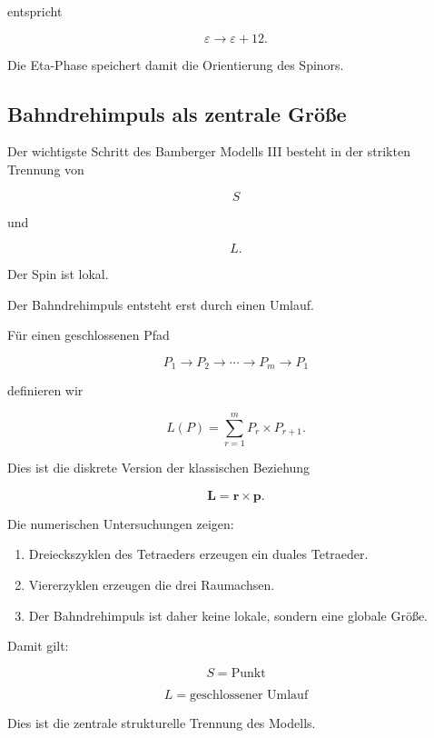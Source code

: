 \documentclass[11pt,a4paper]{article}
\theoremstyle{definition}
\theoremstyle{remark}
\begin{document}
	entspricht
	
	\[
	\varepsilon
	\rightarrow
	\varepsilon+12.
	\]
	
	Die Eta-Phase speichert damit die Orientierung
	des Spinors.
	
	
	\subsection{Bahndrehimpuls als zentrale Größe}
	
	Der wichtigste Schritt des Bamberger Modells III
	besteht in der strikten Trennung von
	
	\[
	S
	\]
	
	und
	
	\[
	L.
	\]
	
	Der Spin ist lokal.
	
	Der Bahndrehimpuls entsteht erst durch einen Umlauf.
	
	\bigskip
	
	Für einen geschlossenen Pfad
	
	\[
	P_1
	\rightarrow
	P_2
	\rightarrow
	\cdots
	\rightarrow
	P_m
	\rightarrow
	P_1
	\]
	
	definieren wir
	
	\[
	L(P)
	=
	\sum_{r=1}^{m}
	P_r
	\times
	P_{r+1}.
	\]
	
	Dies ist die diskrete Version der klassischen Beziehung
	
	\[
	\mathbf L
	=
	\mathbf r
	\times
	\mathbf p.
	\]
	
	\bigskip
	
	Die numerischen Untersuchungen zeigen:
	
	\begin{enumerate}
	\item Dreieckszyklen des Tetraeders erzeugen ein duales Tetraeder.
	\item Viererzyklen erzeugen die drei Raumachsen.
	\item Der Bahndrehimpuls ist daher keine lokale,
	sondern eine globale Größe.
	\end{enumerate}
	
	Damit gilt:
	
	\[
	\boxed{
	S=\text{Punkt}
	}
	\]
	
	\[
	\boxed{
	L=\text{geschlossener Umlauf}
	}
	\]
	
	Dies ist die zentrale strukturelle Trennung
	des Modells.
	
	
\end{document}
